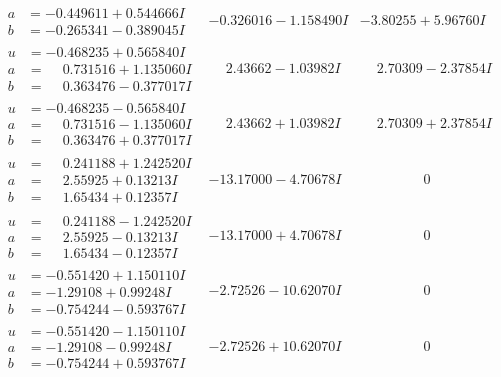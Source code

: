 \documentclass[1p]{elsarticle_modified}
\theoremstyle{definition}
\begin{document}
$$\begin{array}{c|c|c}
\begin{aligned}
a &= -0.449611 + 0.544666 I \\
b &= -0.265341 - 0.389045 I\end{aligned}
 & -0.326016 - 1.158490 I & -3.80255 + 5.96760 I \\ \hline\begin{aligned}
u &= -0.468235 + 0.565840 I \\
a &= \phantom{-}0.731516 + 1.135060 I \\
b &= \phantom{-}0.363476 - 0.377017 I\end{aligned}
 & \phantom{-}2.43662 - 1.03982 I & \phantom{-}2.70309 - 2.37854 I \\ \hline\begin{aligned}
u &= -0.468235 - 0.565840 I \\
a &= \phantom{-}0.731516 - 1.135060 I \\
b &= \phantom{-}0.363476 + 0.377017 I\end{aligned}
 & \phantom{-}2.43662 + 1.03982 I & \phantom{-}2.70309 + 2.37854 I \\ \hline\begin{aligned}
u &= \phantom{-}0.241188 + 1.242520 I \\
a &= \phantom{-}2.55925 + 0.13213 I \\
b &= \phantom{-}1.65434 + 0.12357 I\end{aligned}
 & -13.17000 - 4.70678 I & \phantom{-0.000000 } 0 \\ \hline\begin{aligned}
u &= \phantom{-}0.241188 - 1.242520 I \\
a &= \phantom{-}2.55925 - 0.13213 I \\
b &= \phantom{-}1.65434 - 0.12357 I\end{aligned}
 & -13.17000 + 4.70678 I & \phantom{-0.000000 } 0 \\ \hline\begin{aligned}
u &= -0.551420 + 1.150110 I \\
a &= -1.29108 + 0.99248 I \\
b &= -0.754244 - 0.593767 I\end{aligned}
 & -2.72526 - 10.62070 I & \phantom{-0.000000 } 0 \\ \hline\begin{aligned}
u &= -0.551420 - 1.150110 I \\
a &= -1.29108 - 0.99248 I \\
b &= -0.754244 + 0.593767 I\end{aligned}
 & -2.72526 + 10.62070 I & \phantom{-0.000000 } 0 \\ \hline\begin{aligned}

\end{aligned}
\end{array}$$
\end{document}
